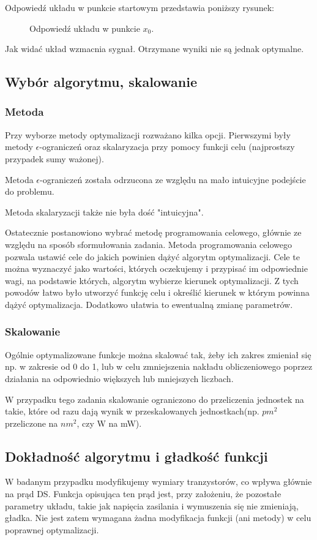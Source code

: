 \documentclass{article}
\begin{document}
Odpowiedź układu w punkcie startowym przedstawia poniższy rysunek:


\begin{figure}[h]
\centering
\caption{Odpowiedź układu w punkcie \(x_0\).}
\end{figure}

Jak widać układ wzmacnia sygnał. Otrzymane wyniki nie są jednak optymalne.

\subsection{Wybór algorytmu, skalowanie}
\subsubsection{Metoda}
Przy wyborze metody optymalizacji rozważano kilka opcji. Pierwszymi były metody \(\epsilon\)-ograniczeń oraz skalaryzacja przy pomocy funkcji celu (najprostszy przypadek sumy ważonej).

Metoda \(\epsilon\)-ograniczeń została odrzucona ze względu na mało intuicyjne podejście do problemu.

Metoda skalaryzacji także nie była dość "intuicyjna".

Ostatecznie postanowiono wybrać metodę programowania celowego, głównie ze względu na sposób sformułowania zadania.
Metoda programowania celowego pozwala ustawić cele do jakich powinien dążyć algorytm optymalizacji. Cele te można wyznaczyć jako wartości, których oczekujemy i przypisać im odpowiednie wagi, na podstawie których, algorytm wybierze kierunek optymalizacji.
Z tych powodów łatwo było utworzyć funkcję celu i określić kierunek w którym powinna dążyć optymalizacja. Dodatkowo ułatwia to ewentualną zmianę parametrów.

\subsubsection{Skalowanie}
Ogólnie optymalizowane funkcje można skalować tak, żeby ich zakres zmieniał się np. w zakresie od 0 do 1, lub w celu zmniejszenia nakładu obliczeniowego poprzez działania na odpowiednio większych lub mniejszych liczbach.

W przypadku tego zadania skalowanie ograniczono do przeliczenia jednostek na takie, które od razu dają  wynik w przeskalowanych jednostkach(np. \( pm^2\) przeliczone na \(nm^2\), czy W na mW).
\subsection{Dokładność algorytmu i gładkość funkcji}
W badanym przypadku modyfikujemy wymiary tranzystorów, co wpływa głównie na prąd DS. Funkcja opisująca ten prąd jest, przy założeniu, że pozostałe parametry układu, takie jak napięcia zasilania i wymuszenia się nie zmieniają, gładka. Nie jest zatem wymagana żadna modyfikacja funkcji (ani metody) w celu poprawnej optymalizacji. 
\end{document}

